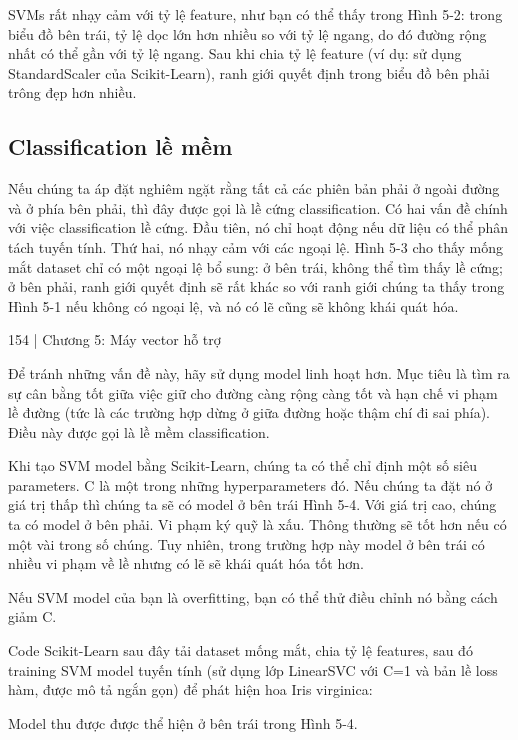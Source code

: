 SVMs rất nhạy cảm với tỷ lệ feature, như bạn có thể thấy trong Hình 5-2: trong biểu đồ bên trái, tỷ lệ dọc lớn hơn nhiều so với tỷ lệ ngang, do đó đường rộng nhất có thể gần với tỷ lệ ngang. Sau khi chia tỷ lệ feature (ví dụ: sử dụng StandardScaler của Scikit-Learn), ranh giới quyết định trong biểu đồ bên phải trông đẹp hơn nhiều.

\subsection{Classification lề mềm}

Nếu chúng ta áp đặt nghiêm ngặt rằng tất cả các phiên bản phải ở ngoài đường và ở phía bên phải, thì đây được gọi là lề cứng classification. Có hai vấn đề chính với việc classification lề cứng. Đầu tiên, nó chỉ hoạt động nếu dữ liệu có thể phân tách tuyến tính. Thứ hai, nó nhạy cảm với các ngoại lệ. Hình 5-3 cho thấy mống mắt dataset chỉ có một ngoại lệ bổ sung: ở bên trái, không thể tìm thấy lề cứng; ở bên phải, ranh giới quyết định sẽ rất khác so với ranh giới chúng ta thấy trong Hình 5-1 nếu không có ngoại lệ, và nó có lẽ cũng sẽ không khái quát hóa.

154 | Chương 5: Máy vector hỗ trợ

Để tránh những vấn đề này, hãy sử dụng model linh hoạt hơn. Mục tiêu là tìm ra sự cân bằng tốt giữa việc giữ cho đường càng rộng càng tốt và hạn chế vi phạm lề đường (tức là các trường hợp dừng ở giữa đường hoặc thậm chí đi sai phía). Điều này được gọi là lề mềm classification.

Khi tạo SVM model bằng Scikit-Learn, chúng ta có thể chỉ định một số siêu parameters. C là một trong những hyperparameters đó. Nếu chúng ta đặt nó ở giá trị thấp thì chúng ta sẽ có model ở bên trái Hình 5-4. Với giá trị cao, chúng ta có model ở bên phải. Vi phạm ký quỹ là xấu. Thông thường sẽ tốt hơn nếu có một vài trong số chúng. Tuy nhiên, trong trường hợp này model ở bên trái có nhiều vi phạm về lề nhưng có lẽ sẽ khái quát hóa tốt hơn.

Nếu SVM model của bạn là overfitting, bạn có thể thử điều chỉnh nó bằng cách giảm C.

Code Scikit-Learn sau đây tải dataset mống mắt, chia tỷ lệ features, sau đó training SVM model tuyến tính (sử dụng lớp LinearSVC với C=1 và bản lề loss hàm, được mô tả ngắn gọn) để phát hiện hoa Iris virginica:

Model thu được được thể hiện ở bên trái trong Hình 5-4.

